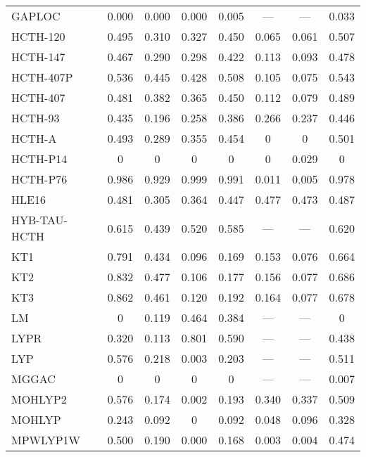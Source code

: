 \begin{table*}
\begin{tabular}{|l|c|c|c|c|c|c|c|}
GAPLOC~\cite{Fabiano2014_2016} & 0.000 & 0.000 & 0.000 & 0.005 & --- & --- & 0.033 \\
HCTH-120~\cite{Boese2000_1670} & 0.495 & 0.310 & 0.327 & 0.450 & 0.065 & 0.061 & 0.507 \\
HCTH-147~\cite{Boese2000_1670} & 0.467 & 0.290 & 0.298 & 0.422 & 0.113 & 0.093 & 0.478 \\
HCTH-407P~\cite{Boese2003_5965} & 0.536 & 0.445 & 0.428 & 0.508 & 0.105 & 0.075 & 0.543 \\
HCTH-407~\cite{Boese2001_5497} & 0.481 & 0.382 & 0.365 & 0.450 & 0.112 & 0.079 & 0.489 \\
HCTH-93~\cite{Hamprecht1998_6264} & 0.435 & 0.196 & 0.258 & 0.386 & 0.266 & 0.237 & 0.446 \\
HCTH-A~\cite{Hamprecht1998_6264} & 0.493 & 0.289 & 0.355 & 0.454 & 0 & 0 & 0.501 \\
HCTH-P14~\cite{Menconi2001_3958} & 0 & 0 & 0 & 0 & 0 & 0.029 & 0 \\
HCTH-P76~\cite{Menconi2001_3958} & 0.986 & 0.929 & 0.999 & 0.991 & 0.011 & 0.005 & 0.978 \\
HLE16~\cite{Verma2017_380} & 0.481 & 0.305 & 0.364 & 0.447 & 0.477 & 0.473 & 0.487 \\
HYB-TAU-HCTH~\cite{Boese2002_9559} & 0.615 & 0.439 & 0.520 & 0.585 & --- & --- & 0.620 \\
KT1~\cite{Keal2003_3015} & 0.791 & 0.434 & 0.096 & 0.169 & 0.153 & 0.076 & 0.664 \\
KT2~\cite{Keal2003_3015} & 0.832 & 0.477 & 0.106 & 0.177 & 0.156 & 0.077 & 0.686 \\
KT3~\cite{Keal2004_5654} & 0.862 & 0.461 & 0.120 & 0.192 & 0.164 & 0.077 & 0.678 \\
LM~\cite{Langreth1981_446,Hu1985_391} & 0 & 0.119 & 0.464 & 0.384 & --- & --- & 0 \\
LYPR~\cite{Ai2021_1207} & 0.320 & 0.113 & 0.801 & 0.590 & --- & --- & 0.438 \\
LYP~\cite{Lee1988_785,Miehlich1989_200} & 0.576 & 0.218 & 0.003 & 0.203 & --- & --- & 0.511 \\
MGGAC~\cite{Patra2019_155140} & 0 & 0 & 0 & 0 & --- & --- & 0.007 \\
MOHLYP2~\cite{Zheng2009_808} & 0.576 & 0.174 & 0.002 & 0.193 & 0.340 & 0.337 & 0.509 \\
MOHLYP~\cite{Schultz2005_11127} & 0.243 & 0.092 & 0 & 0.092 & 0.048 & 0.096 & 0.328 \\
MPWLYP1W~\cite{Dahlke2005_15677} & 0.500 & 0.190 & 0.000 & 0.168 & 0.003 & 0.004 & 0.474 \\

\end{tabular}
\end{table*}
